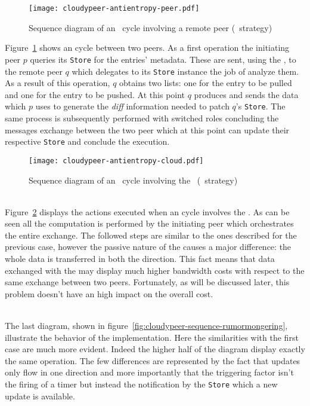 \begin{figure}[h]
  \centering
  \texttt{[image: cloudypeer-antientropy-peer.pdf]}
  \caption{Sequence diagram of an \antientropy\ cycle involving a remote
    peer (\PUSHPULL\ strategy)}
  \label{fig:cloudypeer-sequence-antientropy-peer}
\end{figure}

Figure~\ref{fig:cloudypeer-sequence-antientropy-peer} shows an
\antientropy cycle between two peers. As a first operation the
initiating peer $p$ queries its \texttt{Store} for the entries'
metadata. These are sent, using the \networkhelper, to the remote
peer $q$ which delegates to its \texttt{Store} instance the job of
analyze them. As a result of this operation, $q$ obtains two lists:
one for the entry to be pulled and one for the entry to be pushed.
At this point $q$ produces and sends the data which  $p$ uses to generate
the \textit{diff} information needed to patch $q$'s \texttt{Store}. The
same process is subsequently performed with switched roles concluding
the messages exchange between the two peer which at this point can
update their respective \texttt{Store} and conclude the execution.

\begin{figure}[h]
  \centering
  \texttt{[image: cloudypeer-antientropy-cloud.pdf]}
  \caption{Sequence diagram of an \antientropy\ cycle involving the
    \cloud\ (\PUSHPULL\ strategy)}
  \label{fig:cloudypeer-sequence-antientropy-cloud}
\end{figure}

\ \\
\noindent Figure~\ref{fig:cloudypeer-sequence-antientropy-cloud} displays the
actions executed when an \antientropy cycle involves the \cloud. As
can be seen all the computation is performed by the initiating peer
which orchestrates the entire exchange. The followed steps are similar
to the ones described for the previous case, however the passive
nature of the \cloud causes a major difference: the whole data is
transferred in both the direction. This fact means that data exchanged
with the \cloud may display much higher bandwidth costs with respect
to the same exchange between two peers. Fortunately, as will be
discussed later, this problem doesn't have an high impact on the
overall cost.

\ \\
\noindent The last diagram, shown in
figure~\ref{fig:cloudypeer-sequence-rumormongering}, illustrate the
behavior of the \rumormongering implementation. Here the similarities
with the first case are much more evident. Indeed the higher half of the
diagram display exactly the same operation. The few differences are
represented by the fact that updates only flow in one direction and
more importantly that the triggering factor isn't the firing of a
timer but instead the notification by the \texttt{Store} which a new
update is available.

